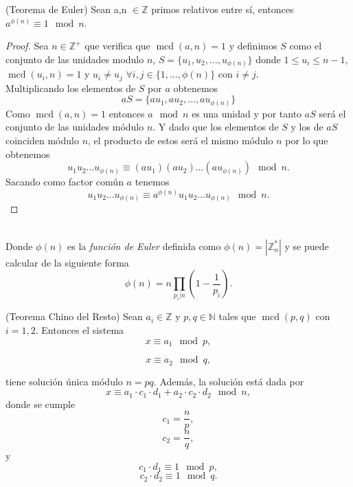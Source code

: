 \begin{teorema}
	(Teorema de Euler) Sean a,n $\in \mathbb{Z}$ primos relativos entre sí, entonces $a^{\phi(n)}\equiv 1 \mod n$.
\end{teorema}\vspace*{-10mm}
\begin{proof}
		Sea $n\in \mathbb{Z^+}$ que verifica que $\operatorname{mcd}(a,n)=1$ y definimos $S$ como el conjunto de las unidades modulo $n$, $S=\{u_1,u_2,\dots,u_{\phi(n)}\}$ donde $1\leq u_i\leq n-1$, $\operatorname{mcd}(u_i,n)=1$ y $u_i\neq u_j$ $\forall i,j \in \{1,\dots,\phi(n)\}$ con $ i\neq j$.\\
	Multiplicando  los elementos de $S$ por $a$ obtenemos 
	$$
		aS=\{au_1,au_2,\dots,au_{\phi(n)}\}
	$$
	Como $\operatorname{mcd}(a,n)=1$ entonces $a\mod n$ es una unidad y por tanto $aS$ será el conjunto de las unidades módulo $n$. Y dado que los elementos de $S$ y los de $aS$ coinciden módulo $n$, el producto de estos será el mismo módulo $n$ por lo que obtenemos 
	$$
		u_1u_2\dots u_{\phi(n)} \equiv (au_1)(au_2)\dots (au_{\phi(n)})\mod n.
	$$
	Sacando como factor común $a$ tenemos 
	$$
		u_1u_2\dots u_{\phi(n)} \equiv a^{\phi(n)}u_1u_2\dots u_{\phi(n)}\mod n.
	$$
\end{proof}\\
Donde $\phi(n)$ es la \emph{función de Euler} definida como $\phi(n)=|\mathbb{Z}^*_n|$ y se puede calcular de la siguiente forma $$\phi(n)=n\prod_{p_i|n}\left(1-\frac{1}{p_i}\right).$$

\begin{teorema}
		(Teorema Chino del Resto) Sean $a_i\in \mathbb{Z}$ y $p,q \in \mathbb{N}$ tales que $\operatorname{mcd}(p,q)$ con $i = 1,2$. Entonces el sistema
		$$
			x\equiv a_1 \mod p,
		$$\vspace*{-10mm}

		$$
			x\equiv a_2 \mod q,
		$$

	tiene solución única módulo $n=pq$. Además, la solución está dada por
	$$
		x\equiv a_1\cdot c_1\cdot d_1 +a_2\cdot c_2\cdot d_2 \mod n,
	$$
	donde se cumple
	$$
		c_1=\frac{n}{p},
	$$
	$$
		c_2=\frac{n}{q},
	$$
		y
	$$
		c_1\cdot d_1 \equiv 1 \mod p,
	$$
	$$
		c_2\cdot d_2 \equiv 1 \mod q.
	$$
	
\end{teorema}

